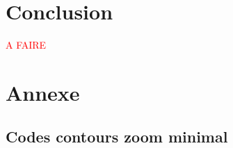 \documentclass[11pt,letterpaper]{article}
\begin{document}



\section{Conclusion}

\textcolor{red}{A FAIRE}
\clearpage
\section{Annexe}
\subsection{Codes contours zoom minimal}
\end{document}
